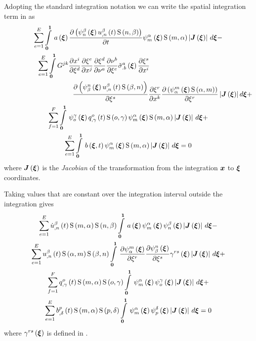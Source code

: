 Adopting the standard integration notation we can write the spatial
integration term in  as
\begin{multline}
  \dsum_{e=1}^{E}\gint{\vect{0}}{\vect{1}}{\fnof{a}{\vect{\xi}}
    \delby{\pbrac{\gbfn{n}{\beta}{\vect{\xi}}\fnof{\nodedof{u}{\beta}{n}}{t}
        \gsf{n}{\beta}}}{t}\gbfn{m}{\alpha}{\vect{\xi}}\gsf{m}{\alpha}
    \abs{\fnof{\matr{J}}{\vect{\xi}}}}{\vect{\xi}} - \\
  \dsum_{e=1}^{E}\dintl{\vect{0}}{\vect{1}}G^{jk}\delby{x^{i}}{\xi^{d}}\delby{\xi^{e}}{x^{j}}
  \delby{\xi^{d}}{\nu^{a}}\delby{\nu^{b}}{\xi^{e}}\fnof{{\tilde{\sigma}}^{a}_{.b}}{\vect{\xi}}
  \delby{\xi^{s}}{x^{i}}
  \quad\quad\quad\quad\quad\quad\quad\quad\quad\quad \\ \quad\quad\quad\quad\quad\quad\quad\quad\quad\quad
  \delby{\pbrac{\gbfn{\beta}{n}{\vect{\xi}}\fnof{\nodedof{u}{\beta}{n}}{t}
      \gsf{\beta}{n}}}{\xi^{s}}\delby{\xi^{r}}{x^{k}}\delby{
    \pbrac{\gbfn{\alpha}{m}{\vect{\xi}}\gsf{\alpha}{m}}}{\xi^{r}}
  \abs{\fnof{\matr{J}}{\vect{\xi}}}d\vect{\xi} + \\
  \dsum_{f=1}^{F}\gint{\vect{0}}{\vect{1}}{\gbfn{o}{\gamma}{\vect{\xi}}
    \fnof{\nodedof{q}{o}{\gamma}}{t}\gsf{o}{\gamma}\gbfn{m}{\alpha}{\vect{\xi}}
    \gsf{m}{\alpha}\abs{\fnof{\matr{J}}{\vect{\xi}}}}{\vect{\xi}} + \\
  \dsum_{e=1}^{E}\gint{\vect{0}}{\vect{1}}{\fnof{b}{\vect{\xi},t}\gbfn{m}{\alpha}{\vect{\xi}}
    \gsf{m}{\alpha}\abs{\fnof{\matr{J}}{\vect{\xi}}}}{\vect{\xi}} = 0
  \label{eqn:diffusionspatialintegration1}
\end{multline}
where $\fnof{\matr{J}}{\vect{\xi}}$ is the \emph{Jacobian} of the
transformation from the integration $\vect{x}$ to $\vect{\xi}$ coordinates.

Taking values that are constant over the integration interval outside the
integration gives
\begin{multline}
  \dsum_{e=1}^{E}\fnof{\nodedof{\dot{u}}{\beta}{n}}{t}\gsf{m}{\alpha}\gsf{n}{\beta}
  \gint{\vect{0}}{\vect{1}}{\fnof{a}{\vect{\xi}}
    \gbfn{m}{\alpha}{\vect{\xi}}\gbfn{n}{\beta}{\vect{\xi}}
    \abs{\fnof{\matr{J}}{\vect{\xi}}}}{\vect{\xi}} - \\
  \dsum_{e=1}^{E}\fnof{\nodedof{u}{\beta}{n}}{t}\gsf{\alpha}{m}\gsf{\beta}{n}
  \gint{\vect{0}}{\vect{1}}{\delby{\gbfn{\alpha}{m}{\vect{\xi}}}{\xi^{r}}
  \delby{\gbfn{\beta}{n}{\vect{\xi}}}{\xi^{s}}\fnof{\gamma^{rs}}{\vect{\xi}}
  \abs{\fnof{\matr{J}}{\vect{\xi}}}}{\vect{\xi}} + \\
  \dsum_{f=1}^{F}\fnof{\nodedof{q}{o}{\gamma}}{t}\gsf{m}{\alpha}\gsf{o}{\gamma}
  \gint{\vect{0}}{\vect{1}}{\gbfn{m}{\alpha}{\vect{\xi}}\gbfn{o}{\gamma}{\vect{\xi}}
    \abs{\fnof{\matr{J}}{\vect{\xi}}}}{\vect{\xi}} + \\
  \dsum_{e=1}^{E}\fnof{\nodedof{b}{p}{\delta}}{t}\gsf{m}{\alpha}\gsf{p}{\delta}
  \gint{\vect{0}}{\vect{1}}{\gbfn{m}{\alpha}{\vect{\xi}}\gbfn{p}{\delta}{\vect{\xi}}
    \abs{\fnof{\matr{J}}{\vect{\xi}}}}{\vect{\xi}} = 0
  \label{eqn:diffusionspatialintegration1}
\end{multline}
where $\fnof{\gamma^{rs}}{\vect{\xi}}$ is defined in 
.

